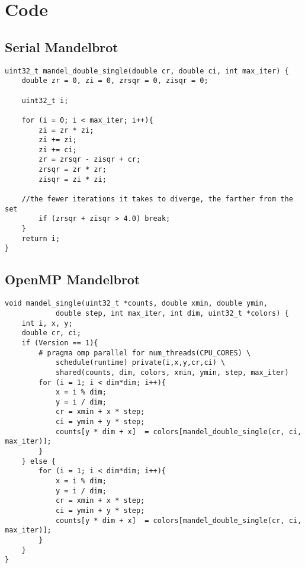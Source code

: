 \documentclass{article}
\begin{document}
\section{Code}
\lstset{language=C,stringstyle=\ttfamily, showstringspaces=false, numbers=left, frame=single, framexrightmargin=0pt, columns=fullflexible, breaklines=true, breakatwhitespace=true}

\subsection{Serial Mandelbrot}\label{appendix:serial}
\begin{lstlisting}
uint32_t mandel_double_single(double cr, double ci, int max_iter) {
    double zr = 0, zi = 0, zrsqr = 0, zisqr = 0;

    uint32_t i;

    for (i = 0; i < max_iter; i++){
		zi = zr * zi;
		zi += zi;
		zi += ci;
		zr = zrsqr - zisqr + cr;
		zrsqr = zr * zr;
		zisqr = zi * zi;
		
    //the fewer iterations it takes to diverge, the farther from the set
		if (zrsqr + zisqr > 4.0) break;
    }
    return i;
}
\end{lstlisting}

\subsection{OpenMP Mandelbrot}\label{appendix:omp}
\begin{lstlisting}
void mandel_single(uint32_t *counts, double xmin, double ymin,
            double step, int max_iter, int dim, uint32_t *colors) {
    int i, x, y;
    double cr, ci;
    if (Version == 1){
        # pragma omp parallel for num_threads(CPU_CORES) \
            schedule(runtime) private(i,x,y,cr,ci) \
            shared(counts, dim, colors, xmin, ymin, step, max_iter)
        for (i = 1; i < dim*dim; i++){
            x = i % dim;
            y = i / dim;
            cr = xmin + x * step;
            ci = ymin + y * step;
            counts[y * dim + x]  = colors[mandel_double_single(cr, ci, max_iter)];
        }
    } else {
        for (i = 1; i < dim*dim; i++){
            x = i % dim;
            y = i / dim;
            cr = xmin + x * step;
            ci = ymin + y * step;
            counts[y * dim + x]  = colors[mandel_double_single(cr, ci, max_iter)];
        }
    }
}
\end{lstlisting}



 

\end{document}
